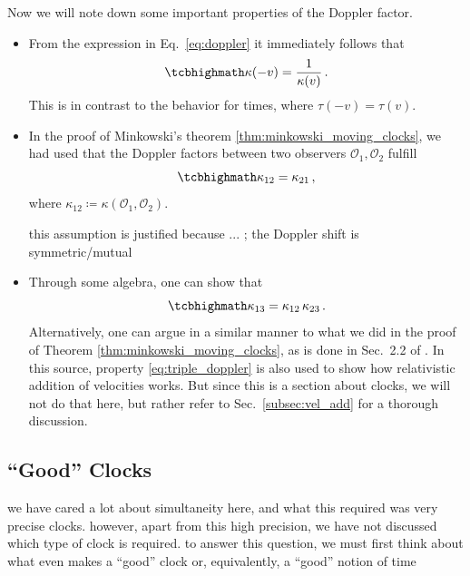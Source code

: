 \documentclass[../relativity_main.tex]{subfiles}
\begin{document}
Now we will note down some important properties of the Doppler factor.
\begin{itemize}
	\item From the expression in Eq.~\eqref{eq:doppler} it immediately follows that
	\begin{equation}
		\eqbox{\kappa(-v) = \frac{1}{\kappa(v)}} \, .
	\end{equation}
	This is in contrast to the behavior for times, where $\tau(-v) = \tau(v)$.
	
	
	\item In the proof of Minkowski's theorem \ref{thm:minkowski_moving_clocks}, we had used that the Doppler factors between two observers $\mathcal{O}_1, \mathcal{O}_2$ fulfill
	\begin{equation}
		\eqbox{\kappa_{12} = \kappa_{21}} \, ,
	\end{equation}
	where $\kappa_{12} \coloneqq \kappa(\mathcal{O}_1, \mathcal{O}_2)$.
	
	this assumption is justified because ... ; the Doppler shift is symmetric/mutual
	
	
	\item Through some algebra, one can show that
	\begin{equation}\label{eq:triple_doppler}
		\eqbox{\kappa_{13} = \kappa_{12} \, \kappa_{23}} \, .
	\end{equation}
	Alternatively, one can argue in a similar manner to what we did in the proof of Theorem \ref{thm:minkowski_moving_clocks}, as is done in Sec.~2.2 of \cite{dragon_geometry_srt}. In this source, property \eqref{eq:triple_doppler} is also used to show how relativistic addition of velocities works. But since this is a section about clocks, we will not do that here, but rather refer to Sec.~\ref{subsec:vel_add} for a thorough discussion.
\end{itemize}



		\subsection{\enquote{Good} Clocks}
we have cared a lot about simultaneity here, and what this required was very precise clocks. however, apart from this high precision, we have not discussed which type of clock is required. to answer this question, we must first think about what even makes a \enquote{good} clock or, equivalently, a \enquote{good} notion of time
\end{document}
